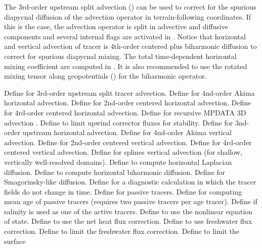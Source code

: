 \begin{klist}
The 3rd-order upstream split advection () can be used
to correct for the spurious diapycnal diffusion of the advection
operator in terrain-following coordinates. If this is the case, the
advection operator is split in advective and diffusive components
and several internal flags are activated in .  Notice
that horizontal and vertical advection of tracer is 4th-order centered
plus biharmonic diffusion to correct for spurious diapycnal mixing.
The total time-dependent horizontal mixing coefficient are computed
in . It is also recommended to use the rotated mixing
tensor along geopotentials () for the biharmonic
operator.
  \begin{klist}
     Define for 3rd-order upstream split
  tracer advection.
     Define for 4nd-order Akima horizontal advection.
     Define for 2nd-order centered horizontal
advection.
     Define for 4rd-order centered horizontal
advection.
     Define for recursive MPDATA 3D advection
  \citep{Margolin_98}.
     Define to limit upwind corrector
  fluxes for stability.
     Define for 3nd-order upstream horizontal advection.
     Define for 4nd-order Akima vertical advection.
     Define for 2nd-order centered vertical
advection.
     Define for 4rd-order centered vertical
advection.
     Define for splines vertical advection
 (for shallow, vertically well-resolved domains).
         Define to compute
  horizontal Laplacian diffusion.
         Define to compute
  horizontal biharmonic diffusion.
     Define for Smagorinsky-like diffusion.
      Define for a diagnostic
  calculation in which the tracer fields do not change in time.
      Define for passive tracers.
      Define for computing mean age of passive
  tracers (requires two passive tracers per age tracer).
          Define if salinity is used as one of the
  active tracers.
     Define to use the nonlinear
  equation of state.
      Define to use the net heat
  flux correction.
      Define to use freshwater flux correction.
      Define to limit the freshwater flux
  correction.
      Define to limit the surface

\end{klist}
\end{klist}
